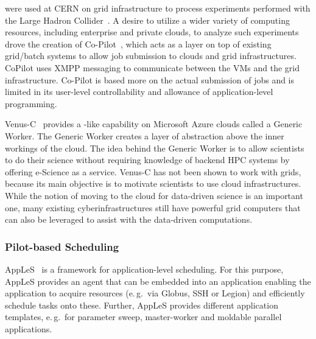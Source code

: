 \documentclass{sig-alternate}
\begin{document}
\pilotjobs were used at CERN on grid infrastructure to process experiments 
performed with the Large Hadron Collider~\cite{copilot-tr}. 
A desire to utilize a wider variety of computing resources, including 
enterprise and private clouds, to analyze such experiments drove the creation 
of Co-Pilot~\cite{copilot-tr}, which acts as a layer on top of existing
grid/batch systems to allow job submission to clouds and grid infrastructures. 
CoPilot uses XMPP messaging to communicate between the VMs and the grid 
infrastructure. Co-Pilot is based more on the actual
submission of jobs and is limited in its user-level controllability and 
allowance of application-level programming.

Venus-C~\cite{venusc-generic-worker} provides a \pilotjob-like
capability on Microsoft Azure clouds called a Generic Worker. The
Generic Worker creates a layer of abstraction above the inner workings
of the cloud.  The idea behind the Generic Worker is to allow
scientists to do their science without requiring knowledge of backend
HPC systems by offering e-Science as a service. Venus-C has not been
shown to work with grids, because its main objective is to motivate
scientists to use cloud infrastructures.  While the notion of moving
to the cloud for data-driven science is an important one, many
existing cyberinfrastructures still have powerful grid computers that
can also be leveraged to assist with the data-driven computations.


\subsubsection{Pilot-based Scheduling}
AppLeS~\cite{Berman:2003:ACG:766629.766632} is a framework for 
application-level scheduling. For this purpose, AppLeS provides an agent that 
can be embedded into an application enabling the application to acquire 
resources (e.\,g.\ via Globus, SSH or Legion) and efficiently schedule tasks 
onto these. Further, AppLeS provides different application templates,
e.\,g.\ for parameter sweep, master-worker and moldable parallel applications.

 
\end{document}
